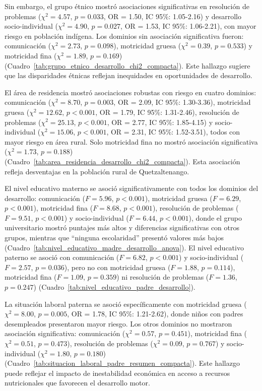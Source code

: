 \documentclass[11pt,letterpaper]{report}
\begin{document}
Sin embargo, el grupo étnico mostró asociaciones significativas en resolución 
de problemas ($\chi^2 = 4.57$, $p = 0.033$, OR = 1.50, IC 95\%: 1.05-2.16) 
y desarrollo socio-individual ($\chi^2 = 4.90$, $p = 0.027$, OR = 1.53, 
IC 95\%: 1.06-2.21), con mayor riesgo en población indígena. Los dominios sin 
asociación significativa fueron: comunicación ($\chi^2 = 2.73$, $p = 0.098$), 
motricidad gruesa ($\chi^2 = 0.39$, $p = 0.533$) y motricidad fina 
($\chi^2 = 1.89$, $p = 0.169$) 
(Cuadro~\ref{tab:grupo_etnico_desarrollo_chi2_compacta}). Este hallazgo 
sugiere que las disparidades étnicas reflejan inequidades en oportunidades de
desarrollo.

El área de residencia mostró asociaciones robustas con riesgo en cuatro 
dominios: comunicación ($\chi^2 = 8.70$, $p = 0.003$, OR = 2.09, 
IC 95\%: 1.30-3.36), motricidad gruesa ($\chi^2 = 12.62$, $p < 0.001$, 
OR = 1.79, IC 95\%: 1.31-2.46), resolución de problemas ($\chi^2 = 25.13$, 
$p < 0.001$, OR = 2.77, IC 95\%: 1.85-4.15) y socio-individual 
($\chi^2 = 15.06$, $p < 0.001$, OR = 2.31, IC 95\%: 1.52-3.51), todos con 
mayor riesgo en área rural. Solo motricidad fina no mostró asociación 
significativa ($\chi^2 = 1.73$, $p = 0.188$) 
(Cuadro~\ref{tab:area_residencia_desarrollo_chi2_compacta}). Esta asociación
refleja desventajas en la población rural de Quetzaltenango.

El nivel educativo materno se asoció significativamente con todos los dominios 
del desarrollo: comunicación ($F = 5.96$, $p < 0.001$), motricidad gruesa 
($F = 6.29$, $p < 0.001$), motricidad fina ($F = 8.68$, $p < 0.001$), 
resolución de problemas ($F = 9.51$, $p < 0.001$) y socio-individual 
($F = 6.44$, $p < 0.001$), donde el grupo universitario mostró puntajes más 
altos y diferencias significativas con otros grupos, mientras que ``ninguna 
escolaridad'' presentó valores más bajos 
(Cuadro~\ref{tab:nivel_educativo_madre_desarrollo_anova}). El nivel educativo 
paterno se asoció con comunicación ($F = 6.82$, $p < 0.001$) y socio-individual 
($F = 2.57$, $p = 0.036$), pero no con motricidad gruesa ($F = 1.88$, 
$p = 0.114$), motricidad fina ($F = 1.09$, $p = 0.359$) ni resolución de 
problemas ($F = 1.36$, $p = 0.247$) 
(Cuadro~\ref{tab:nivel_educativo_padre_desarrollo}).

La situación laboral paterna se asoció específicamente con motricidad gruesa 
($\chi^2 = 8.00$, $p = 0.005$, OR = 1.78, IC 95\%: 1.21-2.62), donde niños 
con padres desempleados presentaron mayor riesgo. Los otros dominios no 
mostraron asociación significativa: comunicación ($\chi^2 = 0.57$, $p = 0.451$), 
motricidad fina ($\chi^2 = 0.51$, $p = 0.473$), resolución de problemas 
($\chi^2 = 0.09$, $p = 0.767$) y socio-individual ($\chi^2 = 1.80$, 
$p = 0.180$) (Cuadro~\ref{tab:situacion_laboral_padre_resumen_compacta}). 
Este hallazgo puede reflejar el impacto de inestabilidad económica en 
acceso a recursos nutricionales que favorecen el desarrollo motor.
\end{document}

